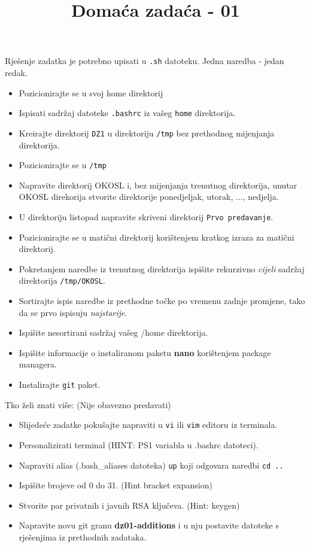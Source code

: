\documentclass[12pt,a4paper]{article}
\newcommand{\shell}[1]{\texttt{#1}}
\begin{document}
  \title{Domaća zadaća - 01}
  \maketitle
  Rješenje zadatka je potrebno upisati u \shell{.sh} datoteku. Jedna naredba - jedan redak.
  \begin{itemize}
  	\item Pozicionirajte se u svoj home direktorij
    \item Ispisati sadržaj datoteke \shell{.bashrc} iz vašeg \shell{home} direktorija.
    \item Kreirajte direktorij \shell{DZ1} u direktoriju \shell{/tmp} bez prethodnog mijenjanja direktorija.
	\item Pozicionirajte se u \shell{/tmp}
    \item Napravite direktorij OKOSL i, bez mijenjanja trenutnog direktorija, unutar OKOSL direkorija stvorite direktorije ponedjeljak, utorak, ..., nedjelja.
    \item U direktoriju listopad napravite skriveni direktorij \shell{Prvo predavanje}.
    \item Pozicionirajte se u matični direktorij korištenjem kratkog izraza za matični direktorij.
    \item Pokretanjem naredbe iz trenutnog direktorija ispišite rekurzivno \textit{cijeli} sadržaj direktorija \shell{/tmp/OKOSL}.
    \item Sortirajte ispis naredbe iz prethodne točke po vremenu zadnje promjene, tako da se prvo ispisuju \textit{najstarije}.
    \item Ispišite nesortirani sadržaj vašeg /home direktorija.
    \item Ispišite informacije o instaliranom paketu \textbf{nano} korištenjem package managera.
    \item Instalirajte \shell{git} paket.
  \end{itemize}
  Tko želi znati više: (Nije obavezno predavati)
  \begin{itemize}
    \item Slijedeće zadatke pokušajte napraviti u \shell{vi} ili \shell{vim} editoru iz terminala.
    \item Personalizirati terminal (HINT: PS1 variabla u .bashrc datoteci).
    \item Napraviti alias (.bash\_aliases datoteka) \shell{up} koji odgovara naredbi \shell{cd ..}
    \item Ispišite brojeve od 0 do 31. (Hint bracket expansion)
    \item Stvorite par privatnih i javnih RSA ključeva. (Hint: keygen)
    \item Napravite novu git granu \textbf{dz01-additions} i u nju postavite datoteke s rješenjima iz prethodnih zadataka. 
  \end{itemize}
\end{document}

